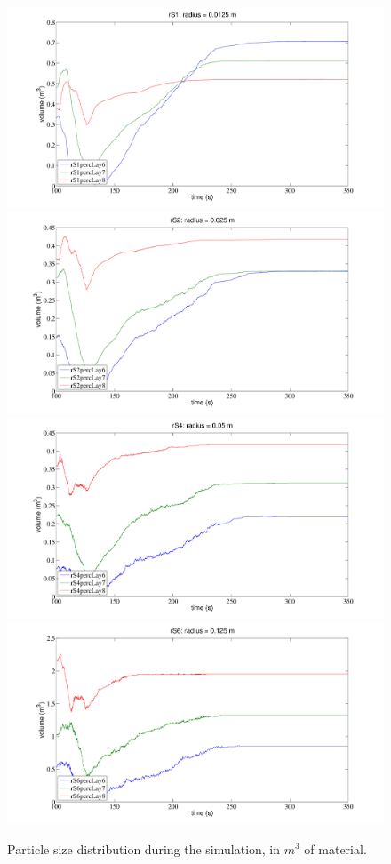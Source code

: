 \begin{figure}
\centering 
  \subfloat%
  {
	  \includegraphics[width=.48\columnwidth]{images/113rS120151111150702}
	  \label{fig:113rS120151111150702}
  }
  \quad
    \subfloat
    {
	  \includegraphics[width=.48\columnwidth]{images/115rS220151111150702}
	  \label{fig:115rS220151111150702}
  }
  \\
  \subfloat%
  {
	  \includegraphics[width=.48\columnwidth]{images/117rS420151111150702}
	  \label{fig:117rS420151111150702}
  }
  \quad
    \subfloat%
    {
	  \includegraphics[width=.48\columnwidth]{images/119rS620151111150702}
	  \label{fig:119rS620151111150702}  }
  \\
  \caption{Particle size distribution during the simulation, in $m^3$ of
  material.}
  \label{fig:096sinterplots}
\end{figure}